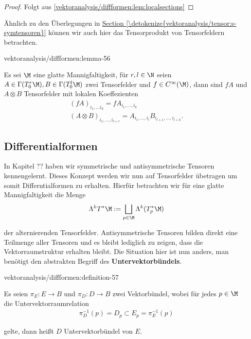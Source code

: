 \documentclass[letterpaper,10pt,english]{jupyterBook}
\begin{document}
\begin{proof}
 Folgt aus \cref{vektoranalysis/diffformen:lem:localsections} 
\end{proof}

\par
Ähnlich zu den Überlegungen in \hyperref[\detokenize{vektoranalysis/tensor:s-symtensoren}]{Section \ref{\detokenize{vektoranalysis/tensor:s-symtensoren}}} können wir auch hier das Tensorprodukt von Tensorfeldern betrachten.
\begin{lemma}{}{vektoranalysis/diffformen:lemma-56}



\par
Es sei \(\M\) eine glatte Mannigfaltigkeit, für \(r,l\in \N\) seien \(A\in \Gamma(T^r_0\M), B\in \Gamma(T^l_0\M)\) zwei Tensorfelder und \(f\in C^\infty(\M)\), dann sind \(fA\) und \(A\otimes B\) Tensorfelder mit lokalen Koeffezienten
\begin{align*}
(fA)_{i_1,\ldots i_{k}} = f A_{i_1,\ldots, i_k}\\
(A\otimes B)_{i_1,\ldots,i_{l+r}} = A_{i_1,\ldots, i_l} B_{i_{l+1},\ldots, i_{l+k}}.
\end{align*}\end{lemma}


\subsection{Differentialformen}
\label{\detokenize{vektoranalysis/diffformen:differentialformen}}
\par
In Kapitel ?? haben wir symmetrische und antisymmetrische Tensoren kennengelernt. Dieses Konzept werden wir nun auf Tensorfelder übetragen um somit Differntialformen zu erhalten. Hierfür betrachten wir für eine glatte Mannigfaltigkeit die Menge
\begin{align*}
\Lambda^k T^\ast\M := \bigsqcup_{p\in\M} \Lambda^k (T^\ast_p\M)
\end{align*}
\par
der alternierenden Tensorfelder. Antisymmetrische Tensoren bilden direkt eine Teilmenge aller Tensoren und es bleibt lediglich zu zeigen, dass die Vektorraumstruktur erhalten bleibt. Die Situation hier ist nun anders, man benötigt den abstrakten Begriff des \textbf{Untervektorbündels}.
\begin{definition}{}{vektoranalysis/diffformen:definition-57}



\par
Es seien \(\pi_E:E\to B\) und \(\pi_D:D\to B\) zwei Vektorbündel, wobei für jedes \(p\in\M\) die Untervektorraumrelation
\begin{align*}
\pi_D^{-1}(p) = D_p\subset E_p = \pi_E^{-1}(p)
\end{align*}
\par
gelte, dann heißt \(D\) Untervektorbündel von \(E\).
\end{definition}
\end{document}
